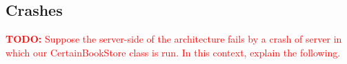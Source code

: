 \documentclass[11pt,a4paper,english]{article}
\newcommand{\todo}[1]{\textcolor{red}{\textbf{TODO: }#1}}
\begin{document}
\subsection{Crashes}

\todo{Suppose the server-side of the architecture fails by a crash of server in
which our CertainBookStore class is run. In this context, explain the
following.}


%
%



\end{document}

